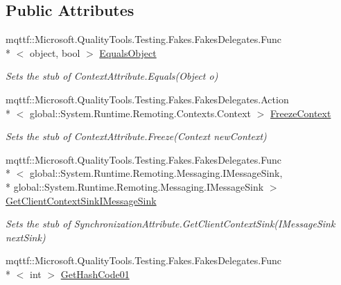 \subsection*{Public Attributes}
\begin{DoxyCompactItemize}
\item 
mqttf\-::\-Microsoft.\-Quality\-Tools.\-Testing.\-Fakes.\-Fakes\-Delegates.\-Func\\*
$<$ object, bool $>$ \hyperlink{class_system_1_1_runtime_1_1_remoting_1_1_contexts_1_1_fakes_1_1_stub_synchronization_attribute_a0ac3f6078d25b46efb652548bf8421c0}{Equals\-Object}
\begin{DoxyCompactList}\small\item\em Sets the stub of Context\-Attribute.\-Equals(\-Object o)\end{DoxyCompactList}\item 
mqttf\-::\-Microsoft.\-Quality\-Tools.\-Testing.\-Fakes.\-Fakes\-Delegates.\-Action\\*
$<$ global\-::\-System.\-Runtime.\-Remoting.\-Contexts.\-Context $>$ \hyperlink{class_system_1_1_runtime_1_1_remoting_1_1_contexts_1_1_fakes_1_1_stub_synchronization_attribute_aa6c35ec09b411e7feba23f521747959b}{Freeze\-Context}
\begin{DoxyCompactList}\small\item\em Sets the stub of Context\-Attribute.\-Freeze(\-Context new\-Context)\end{DoxyCompactList}\item 
mqttf\-::\-Microsoft.\-Quality\-Tools.\-Testing.\-Fakes.\-Fakes\-Delegates.\-Func\\*
$<$ global\-::\-System.\-Runtime.\-Remoting.\-Messaging.\-I\-Message\-Sink, \\*
global\-::\-System.\-Runtime.\-Remoting.\-Messaging.\-I\-Message\-Sink $>$ \hyperlink{class_system_1_1_runtime_1_1_remoting_1_1_contexts_1_1_fakes_1_1_stub_synchronization_attribute_a88000724cef8bbcaddaefeee36223629}{Get\-Client\-Context\-Sink\-I\-Message\-Sink}
\begin{DoxyCompactList}\small\item\em Sets the stub of Synchronization\-Attribute.\-Get\-Client\-Context\-Sink(\-I\-Message\-Sink next\-Sink)\end{DoxyCompactList}\item 
mqttf\-::\-Microsoft.\-Quality\-Tools.\-Testing.\-Fakes.\-Fakes\-Delegates.\-Func\\*
$<$ int $>$ \hyperlink{class_system_1_1_runtime_1_1_remoting_1_1_contexts_1_1_fakes_1_1_stub_synchronization_attribute_ade03b010967e2d0137cdd4aeb3403335}{Get\-Hash\-Code01}

\end{DoxyCompactItemize}
